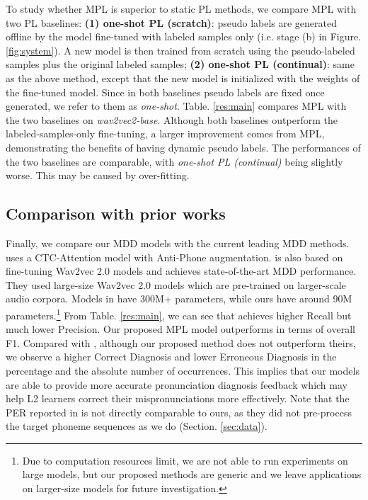 \documentclass[a4paper]{article}
\begin{document}
To study whether MPL is superior to static PL methods, we compare MPL with two PL baselines: \textbf{(1) one-shot PL (scratch)}: pseudo labels are generated offline by the model fine-tuned with labeled samples only (i.e. stage (b) in Figure. \ref{fig:system}). A new model is then trained from scratch using the pseudo-labeled samples plus the original labeled samples; \textbf{(2) one-shot PL (continual)}: same as the above method, except that the new model is initialized with the weights of the fine-tuned model. Since in both baselines pseudo labels are fixed once generated, we refer to them as \textit{one-shot}. Table. \ref{res:main} compares MPL with the two baselines on \textit{wav2vec2-base}. Although both baselines outperform the labeled-samples-only fine-tuning, a larger improvement comes from MPL, demonstrating the benefits of having dynamic pseudo labels. The performances of the two baselines are comparable, with \textit{one-shot PL (continual)} being slightly worse. This may be caused by over-fitting.

\subsection{Comparison with prior works} \label{res:vsprior}

Finally, we compare our MDD models with the current leading MDD methods. \cite{yan20_interspeech} uses a CTC-Attention model with Anti-Phone augmentation. \cite{peng21e_interspeech} is also based on fine-tuning Wav2vec 2.0 models and achieves state-of-the-art MDD performance. They used large-size Wav2vec 2.0 models which are pre-trained on larger-scale audio corpora. Models in \cite{peng21e_interspeech} have 300M+ parameters, while ours have around 90M parameters.\footnote{Due to computation resources limit, we are not able to run experiments on large models, but our proposed methods are generic and we leave applications on larger-size models for future investigation.} From Table. \ref{res:main}, we can see that \cite{yan20_interspeech} achieves higher Recall but much lower Precision. Our proposed MPL model outperforms \cite{yan20_interspeech} in terms of overall F1. Compared with \cite{peng21e_interspeech}, although our proposed method does not outperform theirs, we observe a higher Correct Diagnosis and lower Erroneous Diagnosis in the percentage and the absolute number of occurrences. This implies that our models are able to provide more accurate pronunciation diagnosis feedback which may help L2 learners correct their mispronunciations more effectively. Note that the PER reported in \cite{peng21e_interspeech} is not directly comparable to ours, as they did not pre-process the target phoneme sequences as we do (Section. \ref{sec:data}).
\end{document}
